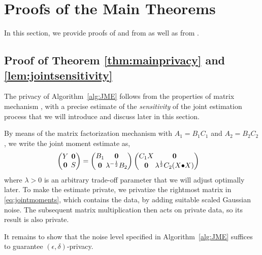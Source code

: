 \section{Proofs of the Main Theorems}\label{sec:proofs}
In this section, we provide proofs of 
and  from  as well as  from .

\subsection{Proof of Theorem \ref{thm:mainprivacy} and \cref{lem:jointsensitivity}}

The privacy of Algorithm~\ref{alg:JME} follows from the 
properties of matrix mechanism \citep{li2015matrix}, with 
a precise estimate of the \emph{sensitivity} of the joint 
estimation process that we will introduce and discuss later
in this section.

By means of the matrix factorization mechanism with $A_1=B_1C_1$
and $A_2=B_2C_2$, we write the joint moment estimate as, 
\begin{align}
\begingroup\setlength{\arraycolsep}{2pt} %
    \begin{pmatrix}Y& \boldsymbol{0}\\ \boldsymbol{0}&S\end{pmatrix}
\endgroup
    &=
\begingroup\setlength{\arraycolsep}{1pt}
\begin{pmatrix}B_1& \boldsymbol{0} \\ \boldsymbol{0} & \lambda^{-\frac{1}{2}} B_2\end{pmatrix}
\endgroup
\begingroup\setlength{\arraycolsep}{1pt}
    \begin{pmatrix}C_1 X& \boldsymbol{0} \\ \boldsymbol{0} & \lambda^{\frac{1}{2}} C_2(X\face X)\end{pmatrix}
\endgroup
\label{eq:jointmoments}
\end{align}
where $\lambda>0$ is an arbitrary trade-off parameter that 
we will adjust optimally later. 
%
To make the estimate private, we privatize the rightmost matrix
in \eqref{eq:jointmoments}, which contains the data, 
by adding suitable scaled Gaussian noise. %
%
The subsequent matrix multiplication then acts on private 
data, so its result is also private. 

It remains to show that the noise level specified in Algorithm~\ref{alg:JME} suffices to guarantee $(\epsilon,\delta)$-privacy.

